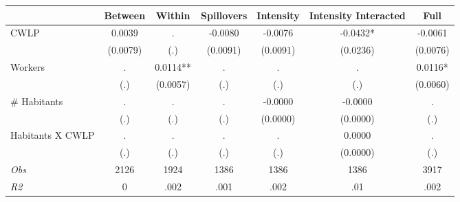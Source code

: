 \begin{tabular}{l*{6}{c}}\hline&\multicolumn{1}{c}{Between}&\multicolumn{1}{c}{Within}&\multicolumn{1}{c}{Spillovers}&\multicolumn{1}{c}{Intensity}&\multicolumn{1}{c}{Intensity Interacted}&\multicolumn{1}{c}{Full}\\ \hline 
CWLP & 0.0039 & . & -0.0080 & -0.0076 & -0.0432* & -0.0061 \\
 & (0.0079) & (.) & (0.0091) & (0.0091) & (0.0236) & (0.0076) \\
Workers & . & 0.0114** & . & . & . & 0.0116* \\
 & (.) & (0.0057) & (.) & (.) & (.) & (0.0060) \\
\# Habitants & . & . & . & -0.0000 & -0.0000 & . \\
 & (.) & (.) & (.) & (0.0000) & (0.0000) & (.) \\
Habitants X CWLP & . & . & . & . & 0.0000 & . \\
 & (.) & (.) & (.) & (.) & (0.0000) & (.) \\
\hline \textit{Obs} & 2126 & 1924 & 1386 & 1386 & 1386 & 3917 \\ \textit{R2} & 0 & .002 & .001 & .002 & .01 & .002 \\ \hline \end{tabular}
